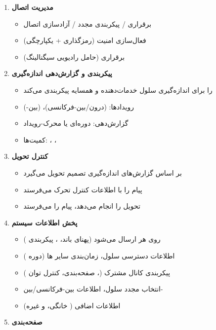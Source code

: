 \begin{enumerate}
\def\labelenumi{\arabic{enumi}.}
\tightlist
\item
  \textbf{مدیریت اتصال}

  \begin{itemize}
  \tightlist
  \item
    برقراری /\allowbreak{} پیکربندی مجدد /\allowbreak{} آزادسازی اتصال 
  \item
    فعال‌سازی امنیت (رمزگذاری + یکپارچگی)
  \item
    برقراری  (حامل رادیویی سیگنالینگ)
  \end{itemize}
\item
  \textbf{پیکربندی و گزارش‌دهی اندازه‌گیری}

  \begin{itemize}
  \tightlist
  \item
     را برای اندازه‌گیری سلول خدمات‌دهنده و همسایه پیکربندی می‌کند
  \item
    رویدادها:  (درون/\allowbreak{}بین-فرکانسی)،  (بین-)
  \item
    گزارش‌دهی: دوره‌ای یا محرک-رویداد
  \item
    کمیت‌ها: ، ، 
  \end{itemize}
\item
  \textbf{کنترل تحویل}

  \begin{itemize}
  \tightlist
  \item
     بر اساس گزارش‌های اندازه‌گیری تصمیم تحویل می‌گیرد
  \item
    پیام  را با اطلاعات کنترل تحرک می‌فرستد
  \item
     تحویل را انجام می‌دهد، پیام  را می‌فرستد
  \end{itemize}
\item
  \textbf{پخش اطلاعات سیستم}

  \begin{itemize}
  \tightlist
  \item
     روی  هر  ارسال می‌شود (پهنای باند، ، پیکربندی )
  \item
     اطلاعات دسترسی سلول، زمان‌بندی سایر ها (دوره )
  \item
     پیکربندی کانال مشترک (، صفحه‌بندی، کنترل توان )
  \item
     انتخاب مجدد سلول، اطلاعات بین-فرکانسی/\allowbreak{}بین-
  \item
     اطلاعات اضافی ( خانگی،  و غیره)
  \end{itemize}
\item
  \textbf{صفحه‌بندی}


\end{enumerate}
